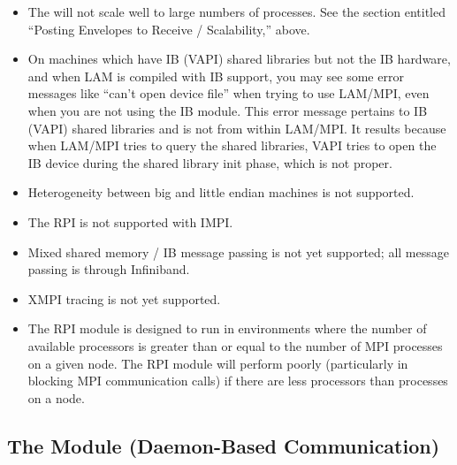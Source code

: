 \begin{itemize}


\item The   will not scale well to large numbers of
  processes.  See the section entitled ``Posting Envelopes to Receive
  / Scalability,'' above.


\item On machines which have IB (VAPI) shared libraries but not the IB
  hardware, and when LAM is compiled with IB support, you may see some
  error messages like ``can't open device file'' when trying to use
  LAM/MPI, even when you are not using the IB module.  This error
  message pertains to IB (VAPI) shared libraries and is not from
  within LAM/MPI.  It results because when LAM/MPI tries to query the
  shared libraries, VAPI tries to open the IB device during the shared
  library init phase, which is not proper.  

\item Heterogeneity between big and little endian machines is not
  supported.
  
\item The  RPI is not supported with IMPI.
  
\item Mixed shared memory / IB message passing is not yet supported;
  all message passing is through Infiniband.
  
\item XMPI tracing is not yet supported.

\item The  RPI module is designed to run in environments where
  the number of available processors is greater than or equal to the
  number of MPI processes on a given node.  The  RPI module
  will perform poorly (particularly in blocking MPI communication
  calls) if there are less processors than processes on a node.


\end{itemize}


\subsection{The  Module (Daemon-Based Communication)}

